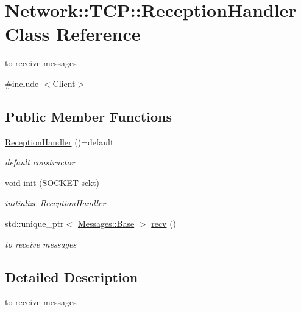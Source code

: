 \hypertarget{class_network_1_1_t_c_p_1_1_reception_handler}{}\section{Network\+:\+:T\+CP\+:\+:Reception\+Handler Class Reference}
\label{class_network_1_1_t_c_p_1_1_reception_handler}


to receive messages  




{\ttfamily \#include $<$Client$>$}

\subsection*{Public Member Functions}
\begin{DoxyCompactItemize}
\item 
\mbox{\label{class_network_1_1_t_c_p_1_1_reception_handler_a36514d3785313fee4feb3d0b70d2b57a}} 
\hyperlink{class_network_1_1_t_c_p_1_1_reception_handler_a36514d3785313fee4feb3d0b70d2b57a}{Reception\+Handler} ()=default
\begin{DoxyCompactList}\small\item\em default constructor \end{DoxyCompactList}\item 
void \hyperlink{class_network_1_1_t_c_p_1_1_reception_handler_a2c14a1b0489719aaa194daf67f2bf47f}{init} (S\+O\+C\+K\+ET sckt)
\begin{DoxyCompactList}\small\item\em initialize \hyperlink{class_network_1_1_t_c_p_1_1_reception_handler}{Reception\+Handler} \end{DoxyCompactList}\item 
std\+::unique\+\_\+ptr$<$ \hyperlink{class_network_1_1_messages_1_1_base}{Messages\+::\+Base} $>$ \hyperlink{class_network_1_1_t_c_p_1_1_reception_handler_a2b872cdd7bd5ac78f8b7a6d2c3380289}{recv} ()
\begin{DoxyCompactList}\small\item\em to receive messages \end{DoxyCompactList}\end{DoxyCompactItemize}


\subsection{Detailed Description}
to receive messages 

